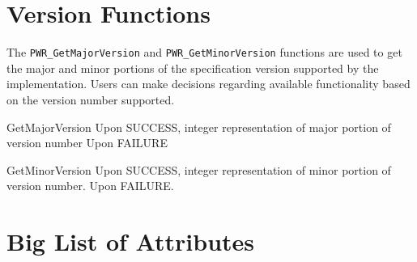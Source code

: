 \section{Version Functions}\label{sec:VersionFunctions}

The \texttt{PWR_GetMajorVersion} and \texttt{PWR_GetMinorVersion} functions are used to get the major and minor portions of the specification version supported by the implementation. 
Users can make decisions regarding available functionality based on the version number supported.

\begin{prototype}{GetMajorVersion}
	 		{Upon SUCCESS, integer representation of major portion of version number}
	 	{Upon FAILURE}
\end{prototype}
\begin{prototype}{GetMinorVersion}
	             {Upon SUCCESS, integer representation of minor portion of version number.}
	 {Upon FAILURE.}
\end{prototype}

\section{Big List of Attributes}\label{sec:BLOA}

